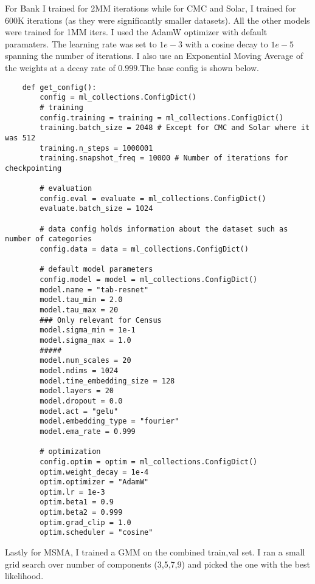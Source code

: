 For Bank I trained for 2MM iterations while for CMC and Solar, I trained for 600K iterations (as they were significantly smaller datasets). All the other models were trained for 1MM iters. I used the AdamW optimizer with default paramaters. The learning rate was set to $1e-3$ with a cosine decay to $1e-5$ spanning the number of iterations. I also use an Exponential Moving Average of the weights at a decay rate of $0.999$.The base config is shown below.

\begin{verbatim}
    def get_config():
        config = ml_collections.ConfigDict()
        # training
        config.training = training = ml_collections.ConfigDict()
        training.batch_size = 2048 # Except for CMC and Solar where it was 512
        training.n_steps = 1000001
        training.snapshot_freq = 10000 # Number of iterations for checkpointing
    
        # evaluation
        config.eval = evaluate = ml_collections.ConfigDict()
        evaluate.batch_size = 1024
    
        # data config holds information about the dataset such as number of categories
        config.data = data = ml_collections.ConfigDict()
    
        # default model parameters
        config.model = model = ml_collections.ConfigDict()
        model.name = "tab-resnet"
        model.tau_min = 2.0
        model.tau_max = 20
        ### Only relevant for Census
        model.sigma_min = 1e-1
        model.sigma_max = 1.0
        #####
        model.num_scales = 20
        model.ndims = 1024
        model.time_embedding_size = 128
        model.layers = 20
        model.dropout = 0.0
        model.act = "gelu"
        model.embedding_type = "fourier"
        model.ema_rate = 0.999

        # optimization
        config.optim = optim = ml_collections.ConfigDict()
        optim.weight_decay = 1e-4
        optim.optimizer = "AdamW"
        optim.lr = 1e-3
        optim.beta1 = 0.9
        optim.beta2 = 0.999
        optim.grad_clip = 1.0
        optim.scheduler = "cosine"
\end{verbatim}

Lastly for MSMA, I trained a GMM on the combined train,val set. I ran a small grid search over number of components (3,5,7,9) and picked the one with the best likelihood.

